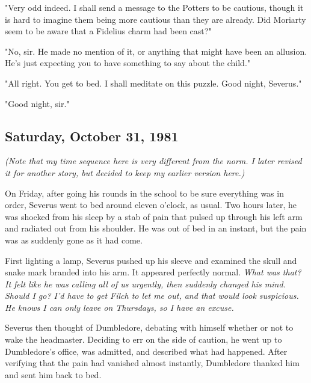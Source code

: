 "Very odd indeed. I shall send a message to the Potters to be cautious, though it is hard to imagine them being more cautious than they are already. Did Moriarty seem to be aware that a Fidelius charm had been cast?"

"No, sir. He made no mention of it, or anything that might have been an allusion. He's just expecting you to have something to say about the child."

"All right. You get to bed. I shall meditate on this puzzle. Good night, Severus."

"Good night, sir."

\subsection{Saturday, October 31, 1981}

\emph{(Note that my time sequence here is very different from the norm. I later revised it for another story, but decided to keep my earlier version here.)}

On Friday, after going his rounds in the school to be sure everything was in order, Severus went to bed around eleven o'clock, as usual. Two hours later, he was shocked from his sleep by a stab of pain that pulsed up through his left arm and radiated out from his shoulder. He was out of bed in an instant, but the pain was as suddenly gone as it had come.

First lighting a lamp, Severus pushed up his sleeve and examined the skull and snake mark branded into his arm. It appeared perfectly normal. \emph{What was that? It felt like he was calling all of us urgently, then suddenly changed his mind. Should I go? I'd have to get Filch to let me out, and that would look suspicious. He knows I can only leave on Thursdays, so I have an excuse.}

Severus then thought of Dumbledore, debating with himself whether or not to wake the headmaster. Deciding to err on the side of caution, he went up to Dumbledore's office, was admitted, and described what had happened. After verifying that the pain had vanished almost instantly, Dumbledore thanked him and sent him back to bed.



